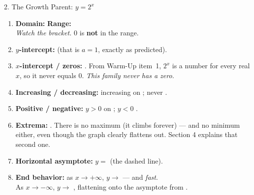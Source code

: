 \documentclass[10pt]{article}
\begin{document}
\begin{notesbox}{2. The Growth Parent: $y=2^{x}$}
\vspace{2pt}
\begin{enumerate}[leftmargin=1.7em, itemsep=3pt]
  \item \textbf{Domain:} \blank{3.2cm} \quad \textbf{Range:} \blank{3.2cm} \\
        \emph{Watch the bracket.} $0$ is \textbf{not} in the range.
  \item \textbf{$y$-intercept:} \blank{1.8cm} \quad (that is $a=1$, exactly as predicted).
  \item \textbf{$x$-intercept / zeros:} \blank{2.2cm}. \; From Warm-Up item~1, $2^{x}$ is a
        \blank{2.2cm} number for every real $x$, so it never equals $0$. \emph{This family never
        has a zero.}
  \item \textbf{Increasing / decreasing:} increasing on \blank{3.0cm}; never \blank{2.2cm}.
  \item \textbf{Positive / negative:} $y>0$ on \blank{3.0cm}; \quad $y<0$ \blank{2.4cm}.
  \item \textbf{Extrema:} \blank{2.6cm}. There is no maximum (it climbs forever) --- and no minimum
        either, even though the graph clearly flattens out. Section 4 explains that second one.
  \item \textbf{Horizontal asymptote:} $y=$ \blank{1.0cm} \quad (the dashed line).
  \item \textbf{End behavior:} as $x\to+\infty$, $y\to$ \blank{1.2cm} --- and \emph{fast}. \\
        As $x\to-\infty$, $y\to$ \blank{1.2cm}, flattening onto the asymptote from
        \blank{1.8cm}.
\end{enumerate}
\end{notesbox}
\end{document}
